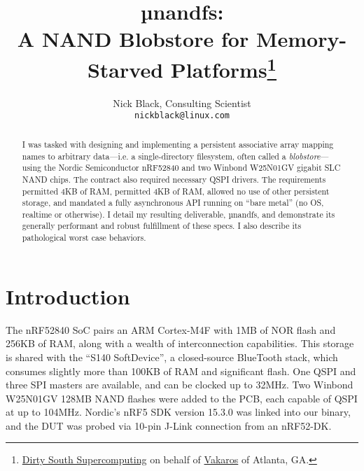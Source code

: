 \documentclass[letterpaper,10pt]{article}
\title{µnandfs:\\
A NAND Blobstore for Memory-Starved Platforms\thanks{
 \href{https://www.dsscaw.com/}{Dirty South Supercomputing} on behalf
 of \href{https://www.vakaros.com/}{Vakaros} of Atlanta, GA.
}\\
}
\author{Nick Black, Consulting Scientist\\
\texttt{nickblack@linux.com}
}
\begin{document}
\maketitle
\thispagestyle{fancy}
\date{}
\begin{abstract}
I was tasked with designing and implementing a persistent associative array
mapping names to arbitrary data---i.e. a single-directory filesystem, often
called a \textit{blobstore}---using the Nordic Semiconductor nRF52840 and two
Winbond W25N01GV gigabit SLC NAND chips. The contract also required necessary
QSPI drivers. The requirements permitted 4KB of RAM, permitted 4KB of RAM,
allowed no use of other persistent storage, and mandated a fully asynchronous
API running on ``bare metal'' (no OS, realtime or otherwise). I detail my
resulting deliverable, µnandfs, and demonstrate its generally performant
and robust fulfillment of these specs. I also describe its pathological worst
case behaviors.
\end{abstract}
\section{Introduction}
The nRF52840\parencite{nrf52840} SoC pairs an ARM Cortex-M4F with 1MB of
NOR flash and 256KB of RAM, along with a wealth of interconnection
capabilities. This storage is shared with the ``S140
SoftDevice''\parencite{s140}, a closed-source BlueTooth stack, which consumes
slightly more than 100KB of RAM and significant flash. One QSPI and three SPI
masters are available, and can be clocked up to 32MHz. Two Winbond W25N01GV\parencite{winbond}
128MB NAND flashes were added to the PCB, each capable of QSPI at up to 104MHz.
Nordic's nRF5 SDK\parencite{nrf52sdk} version 15.3.0 was linked into our binary,
and the DUT was probed via 10-pin J-Link\parencite{segger} connection from
an nRF52-DK\parencite{nrf52dk}.

\printbibliography
\end{document}

